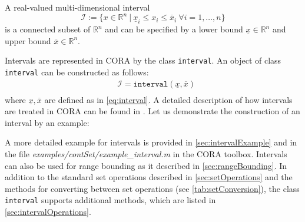  \label{sec:interval}

A real-valued multi-dimensional interval
\begin{equation}
	\mathcal{I} :=\{x \in \mathbb{R}^n ~|~ \underline{x}_i \leq x_i \leq \overline{x}_i ~\forall i = 1,\dots,n \}
	\label{eq:interval}
\end{equation} 
is a connected subset of $\mathbb{R}^n$ and can be specified by a lower bound $\underline{x}\in\mathbb{R}^n$ and upper bound $\overline{x}\in\mathbb{R}^n$.

Intervals are represented in CORA by the class \texttt{interval}. An object of class \texttt{interval} can be constructed as follows:
\begin{equation*}
	\begin{split}
		& \mathcal{I} = \texttt{interval}(\underline{x},\overline{x}) \\
	\end{split}
\end{equation*} 
where $\underline{x},\overline{x}$ are defined as in \eqref{eq:interval}. A detailed description of how intervals are treated in CORA can be found in \cite{Althoff2016a}. Let us demonstrate the construction of an interval by an example:

\begin{center}
\begin{minipage}[t]{0.35\textwidth}
	\vspace{30pt}
	\footnotesize
	
\end{minipage}
\begin{minipage}[t]{0.3\textwidth}
	\vspace{0pt}
	\centering
\end{minipage}
\end{center}

A more detailed example for intervals is provided in \cref{sec:intervalExample} and in the file \textit{examples/contSet/example\_interval.m} in the CORA toolbox. Intervals can also be used for range bounding as it described in \cref{sec:rangeBounding}. In addition to the standard set operations described in \cref{sec:setOperations} and the methods for converting between set operations (see \cref{tab:setConversion}), the class \texttt{interval} supports additional methods, which are listed in \cref{sec:intervalOperations}.


